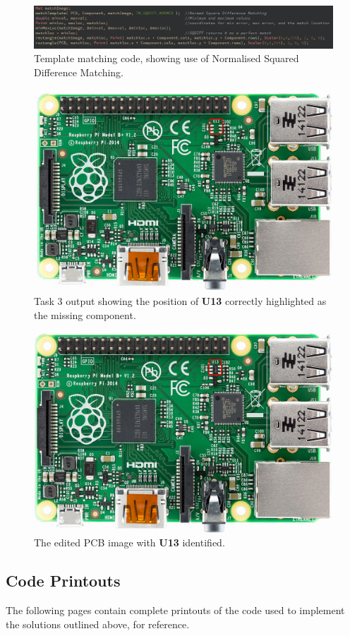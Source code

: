 \documentclass[conference]{IEEEtran}
\begin{document}
\begin{figure}[H]
\centering
\includegraphics[width=5in]{t3_code1}
\caption{Template matching code, showing use of Normalised Squared Difference Matching.}
\label{fig_t3code}
\end{figure}

\begin{figure}[H]
\centering
\includegraphics[width=5in]{t3_missing}
\caption{Task 3 output showing the position of \textbf{U13} correctly highlighted as the missing component.}
\label{fig:t3_missing}
\end{figure}
\begin{figure}[H]
\centering
\includegraphics[width=5in]{t3_complete}
\caption{The edited PCB image with \textbf{U13} identified.}
\label{fig:t3_complete}
\end{figure}
\subsection{Code Printouts}
The following pages contain complete printouts of the code used to implement the solutions outlined above, for reference.



\end{document}
